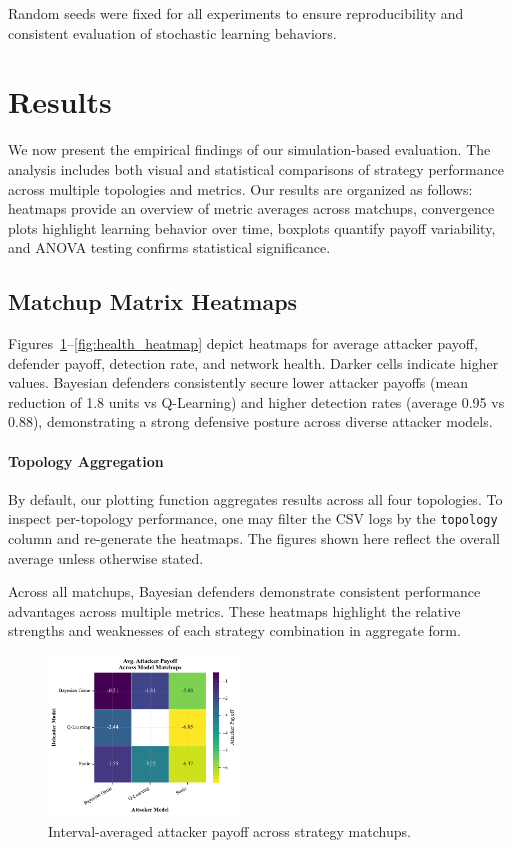 \documentclass[conference]{IEEEtran}
\begin{document}
Random seeds were fixed for all experiments to ensure reproducibility and consistent evaluation of stochastic learning behaviors.

\section{Results}

We now present the empirical findings of our simulation-based evaluation. The analysis includes both visual and statistical comparisons of strategy performance across multiple topologies and metrics. Our results are organized as follows: heatmaps provide an overview of metric averages across matchups, convergence plots highlight learning behavior over time, boxplots quantify payoff variability, and ANOVA testing confirms statistical significance.

\subsection{Matchup Matrix Heatmaps}
Figures~\ref{fig:atk_payoff_heatmap}--\ref{fig:health_heatmap} depict heatmaps for average attacker payoff, defender payoff, detection rate, and network health. Darker cells indicate higher values. Bayesian defenders consistently secure lower attacker payoffs (mean reduction of 1.8 units vs Q-Learning) and higher detection rates (average 0.95 vs 0.88), demonstrating a strong defensive posture across diverse attacker models.

\paragraph{Topology Aggregation}  
By default, our plotting function aggregates results across all four topologies. To inspect per-topology performance, one may filter the CSV logs by the \texttt{topology} column and re-generate the heatmaps. The figures shown here reflect the overall average unless otherwise stated.

Across all matchups, Bayesian defenders demonstrate consistent performance advantages across multiple metrics. These heatmaps highlight the relative strengths and weaknesses of each strategy combination in aggregate form.

\begin{figure}[htbp]
  \centering
  \includegraphics[width=0.45\textwidth]{fig_atk_payoff_heatmap.pdf}
  \caption{Interval-averaged attacker payoff across strategy matchups.}
  \label{fig:atk_payoff_heatmap}
\end{figure}
\end{document}
